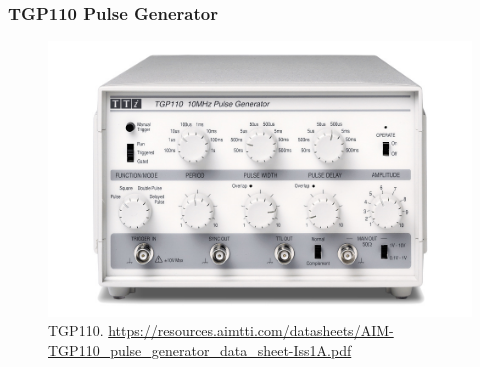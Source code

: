 \begin{frame} [fragile]
\small
	\frametitle{TGP110 Pulse Generator}
    		\begin{figure}
		 \centering
			\includegraphics[scale=0.20]{figures/instruments/AIM_TGP110_1k_0.jpg}
			\caption{TGP110. \url{https://resources.aimtti.com/datasheets/AIM-TGP110_pulse_generator_data_sheet-Iss1A.pdf}}
		\end{figure}
\end{frame}


